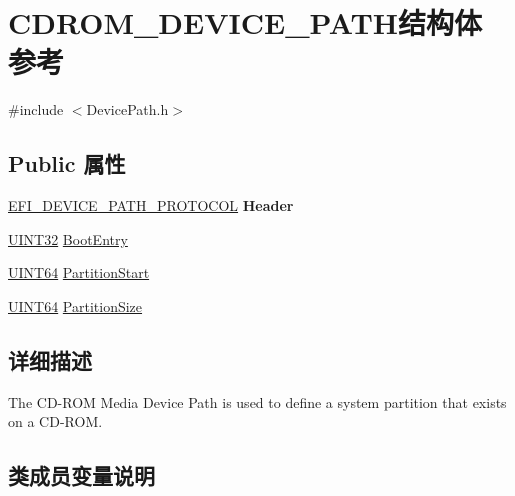 \hypertarget{struct_c_d_r_o_m___d_e_v_i_c_e___p_a_t_h}{}\section{C\+D\+R\+O\+M\+\_\+\+D\+E\+V\+I\+C\+E\+\_\+\+P\+A\+T\+H结构体 参考}
\label{struct_c_d_r_o_m___d_e_v_i_c_e___p_a_t_h}


{\ttfamily \#include $<$Device\+Path.\+h$>$}

\subsection*{Public 属性}
\begin{DoxyCompactItemize}
\item 
\mbox{\label{struct_c_d_r_o_m___d_e_v_i_c_e___p_a_t_h_a214c4485b14ae3d73e0bf23a72499af8}} 
\hyperlink{struct_e_f_i___d_e_v_i_c_e___p_a_t_h___p_r_o_t_o_c_o_l}{E\+F\+I\+\_\+\+D\+E\+V\+I\+C\+E\+\_\+\+P\+A\+T\+H\+\_\+\+P\+R\+O\+T\+O\+C\+OL} {\bfseries Header}
\item 
\hyperlink{_processor_bind_8h_ae1e6edbbc26d6fbc71a90190d0266018}{U\+I\+N\+T32} \hyperlink{struct_c_d_r_o_m___d_e_v_i_c_e___p_a_t_h_a26219b613d1ceec7da60dd6ea90ff030}{Boot\+Entry}
\item 
\hyperlink{_processor_bind_8h_a57be03562867144161c1bfee95ca8f7c}{U\+I\+N\+T64} \hyperlink{struct_c_d_r_o_m___d_e_v_i_c_e___p_a_t_h_a5c6fd80497e4feae215c5ce42e0525b6}{Partition\+Start}
\item 
\hyperlink{_processor_bind_8h_a57be03562867144161c1bfee95ca8f7c}{U\+I\+N\+T64} \hyperlink{struct_c_d_r_o_m___d_e_v_i_c_e___p_a_t_h_ab57c1e0b8f80bec7ee4079ec00df0b69}{Partition\+Size}
\end{DoxyCompactItemize}


\subsection{详细描述}
The C\+D-\/\+R\+OM Media Device Path is used to define a system partition that exists on a C\+D-\/\+R\+OM. 

\subsection{类成员变量说明}
\mbox{\label{struct_c_d_r_o_m___d_e_v_i_c_e___p_a_t_h_a26219b613d1ceec7da60dd6ea90ff030}} 
